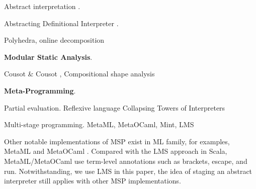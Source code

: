 Abstract interpretation \cite{DBLP:conf/popl/CousotC77}.

Abstracting Definitional Interpreter \cite{DBLP:journals/pacmpl/DaraisLNH17}.

Polyhedra, online decomposition

\textbf{Modular Static Analysis}. 

Cousot \& Cousot \cite{DBLP:conf/cc/CousotC02}, 
Compositional shape analysis \cite{DBLP:conf/popl/CalcagnoDOY09}

\textbf{Meta-Programming}.

Partial evaluation. 
Reflexive language \cite{DBLP:conf/gpce/Asai14}
Collapsing Towers of Interpreters \cite{Amin:2017:CTI:3177123.3158140}

Multi-stage programming. MetaML, MetaOCaml, Mint, LMS

Other notable implementations of MSP exist in ML family, for examples, MetaML \cite{DBLP:conf/pepm/TahaS97} 
and MetaOCaml \cite{DBLP:conf/gpce/CalcagnoTHL03, DBLP:conf/flops/Kiselyov14}.
Compared with the LMS approach in Scala, MetaML/MetaOCaml use term-level annotations such as brackets, 
escape, and run. Notwithstanding, we use LMS in this paper, the idea of staging an abstract interpreter
still applies with other MSP implementations.

